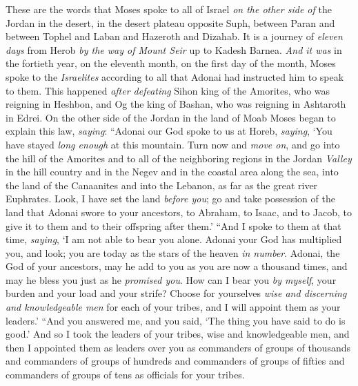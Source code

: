 
\begin{biblechapter} %
 These are the words that Moses spoke to all of Israel \textit{on the other side of} the Jordan in the desert, in the desert plateau opposite Suph, between Paran and between Tophel and Laban and Hazeroth and Dizahab.
\verse It is a journey of \textit{eleven days} from Herob \textit{by the way of Mount Seir} up to Kadesh Barnea.
\verse \textit{And it was} in the fortieth year, on the eleventh month, on the first day of the month, Moses spoke to the \textit{Israelites} according to all that Adonai had instructed him to speak to them.
\verse This happened \textit{after defeating} Sihon king of the Amorites, who was reigning in Heshbon, and Og the king of Bashan, who was reigning in Ashtaroth in Edrei.
\verse On the other side of  the Jordan in the land of Moab Moses began to explain this law, \textit{saying}:
 “Adonai our God spoke to us at Horeb, \textit{saying}, ‘You have stayed \textit{long enough} at this mountain.
\verse Turn now and \textit{move on}, and go into the hill of the Amorites and to all of the neighboring regions in the Jordan \textit{Valley} in the hill country and in the Negev and in the coastal area along the sea, into the land of the Canaanites and into the Lebanon, as far as the great river Euphrates.
\verse Look, I have set the land \textit{before you}; go and take possession of the land that Adonai swore to your ancestors, to Abraham, to Isaac, and to Jacob, to give it to them and to their offspring after them.’
\verse “And I spoke to them at that time, \textit{saying}, ‘I am not able to bear you alone.
\verse Adonai your God has multiplied you, and look; you are today as the stars of the heaven \textit{in number}.
\verse Adonai, the God of your ancestors, may he add to you as you are now a thousand times, and may he bless you just as he \textit{promised you}.
\verse How can I bear you \textit{by myself}, your burden and your load and your strife?
\verse Choose for yourselves \textit{wise and discerning and knowledgeable men} for each of your tribes, and I will appoint them as your leaders.’
\verse “And you answered me, and you said, ‘The thing you have said to do is good.’
\verse And so I took the leaders of your tribes, wise and knowledgeable men, and then I appointed them as leaders over you as commanders of groups of thousands and commanders of groups of hundreds and commanders of groups of fifties and commanders of groups of tens as officials for your tribes.

\end{biblechapter}
